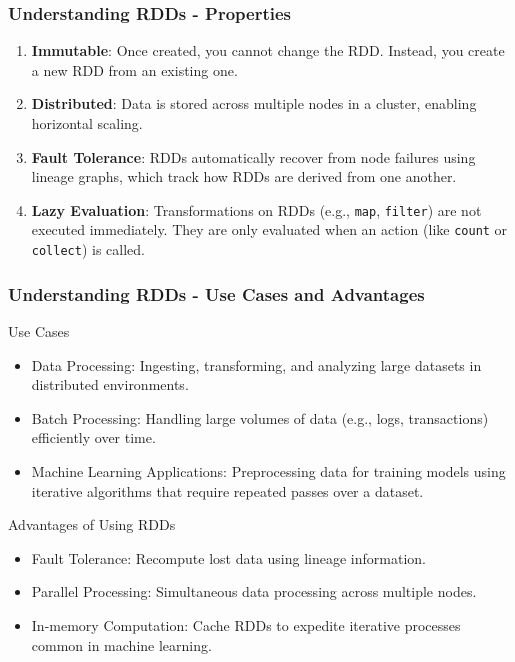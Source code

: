 \documentclass[aspectratio=169]{beamer}
\begin{document}
\begin{frame}[fragile]
    \frametitle{Understanding RDDs - Properties}
    \begin{enumerate}
        \item \textbf{Immutable}: Once created, you cannot change the RDD. Instead, you create a new RDD from an existing one.
        
        \item \textbf{Distributed}: Data is stored across multiple nodes in a cluster, enabling horizontal scaling.
        
        \item \textbf{Fault Tolerance}: RDDs automatically recover from node failures using lineage graphs, which track how RDDs are derived from one another.
        
        \item \textbf{Lazy Evaluation}: Transformations on RDDs (e.g., \texttt{map}, \texttt{filter}) are not executed immediately. They are only evaluated when an action (like \texttt{count} or \texttt{collect}) is called.
    \end{enumerate}
\end{frame}

\begin{frame}[fragile]
    \frametitle{Understanding RDDs - Use Cases and Advantages}
    \begin{block}{Use Cases}
        \begin{itemize}
            \item Data Processing: Ingesting, transforming, and analyzing large datasets in distributed environments.
            \item Batch Processing: Handling large volumes of data (e.g., logs, transactions) efficiently over time.
            \item Machine Learning Applications: Preprocessing data for training models using iterative algorithms that require repeated passes over a dataset.
        \end{itemize}
    \end{block}
    
    \begin{block}{Advantages of Using RDDs}
        \begin{itemize}
            \item Fault Tolerance: Recompute lost data using lineage information.
            \item Parallel Processing: Simultaneous data processing across multiple nodes.
            \item In-memory Computation: Cache RDDs to expedite iterative processes common in machine learning.
        \end{itemize}
    \end{block}
\end{frame}
\end{document}
